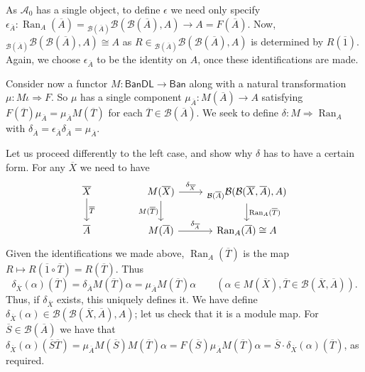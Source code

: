 \documentclass[a4paper,11pt]{article}
\theoremstyle{plain}
\theoremstyle{remark}
\newcommand{\mc}[1]{\mathcal{#1}}
\newcommand{\msf}[1]{\mathsf{#1}}
\newcommand{\ran}{\operatorname{Ran}}
\begin{document}
As $\mc A_0$ has a single object, to define $\epsilon$ we need only specify $\epsilon_{\overline A} \colon \ran_A(\overline A) = {}_{\mc B(\overline A)}\mc B(\mc B(\overline A), A) \to A = F(\overline A)$.  Now, ${}_{\mc B(\overline A)}\mc B(\mc B(\overline A), A) \cong A$ as $R\in {}_{\mc B(\overline A)}\mc B(\mc B(\overline A), A)$ is determined by $R(\overline 1)$.  Again, we choose $\epsilon_{\overline A}$ to be the identity on $A$, once these identifications are made.

Consider now a functor $M \colon \msf{BanDL} \to \msf{Ban}$ along with a natural transformation $\mu \colon M\iota \Rightarrow F$.  So $\mu$ has a single component $\mu_{\overline A} \colon M(\overline A) \to A$ satisfying $F(\overline T) \mu_{\overline A} = \mu_{\overline A} M(\overline T)$ for each $\overline T \in \mc B(\overline A)$.  We seek to define $\delta \colon M \Rightarrow \ran_A$ with $\delta_{\overline A} = \epsilon_{\overline A} \delta_{\overline A} = \mu_{\overline A}$.

Let us proceed differently to the left case, and show why $\delta$ has to have a certain form.  For any $\overline X$ we need to have
\[ \begin{tikzcd}
\overline X \arrow[d, "\overline T"] && M(\overline X) \arrow[r, "\delta_{\overline X}"] \arrow[d, "M(\overline T)"'] & {}_{\mc B(\overline A)}\mc B(\mc B(\overline X,\overline A), A) \arrow[d, "\ran_A(\overline T)"]  \\
\overline A && M(\overline A) \arrow[r, "\delta_{\overline A}"] & \ran_A(\overline A) \cong A
\end{tikzcd} \]
Given the identifications we made above, $\ran_A(\overline T)$ is the map $R \mapsto R(\overline 1\circ \overline T) = R(\overline T)$.  Thus
\[ \delta_{\overline X}(\alpha)(\overline T) = \delta_{\overline A} M(\overline T)\alpha
= \mu_{\overline A} M(\overline T)\alpha
\qquad (\alpha\in M(\overline X), \overline T\in\mc B(\overline X,\overline A)). \]
Thus, if $\delta_{\overline X}$ exists, this uniquely defines it.  We have define $\delta_{\overline X}(\alpha) \in \mc B(\mc B(\overline X, \overline A), A)$; let us check that it is a module map.  For $\overline S\in\mc B(\overline A)$ we have that $\delta_{\overline X}(\alpha)(\overline S\overline T) = \mu_{\overline A} M(\overline S) M(\overline T) \alpha = F(\overline S) \mu_{\overline A} M(\overline T) \alpha = \overline S \cdot \delta_{\overline X}(\alpha)(\overline T)$, as required.
\end{document}
